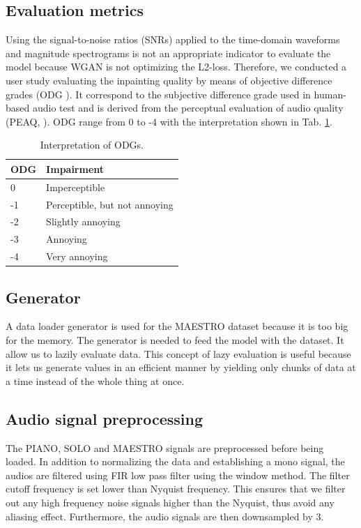 \documentclass{article} %
\begin{document}
\subsection{Evaluation metrics}
Using the signal-to-noise ratios (SNRs) applied to the time-domain waveforms and magnitude spectrograms is not an appropriate indicator to evaluate the model because WGAN is not optimizing the L2-loss. Therefore, we conducted a user study evaluating the inpainting quality by means of objective difference grades (ODG \cite{recommendatioin2001}). It correspond to the subjective difference grade used in human-based audio test and is derived from the perceptual evaluation of audio quality (PEAQ, \cite{recommendatioin2001}). ODG range from 0 to -4 with the interpretation shown in Tab. \ref{tab:odg}.
\begin{table}[ht]
    \centering
    \begin{tabular}{l|l}
        \hline
        ODG & Impairment \\
        \hline
        0   & Imperceptible \\
        -1  & Perceptible, but not annoying \\ 
        -2  & Slightly annoying \\
        -3  & Annoying \\
        -4  & Very annoying \\
        \hline
    \end{tabular}
    \caption{Interpretation of ODGs.}
    \label{tab:odg}
\end{table}

\subsection{Generator}
A data loader generator is used for the MAESTRO dataset because it is too big for the memory. The generator is needed to feed the model with the dataset. It allow us to lazily evaluate data. This concept of lazy evaluation is useful because it lets us generate values in an efficient manner by yielding only chunks of data at a time instead of the whole thing at once.

\subsection{Audio signal preprocessing}
The PIANO, SOLO and MAESTRO signals are preprocessed before being loaded. In addition to normalizing the data and establishing a mono signal, the audios are filtered using FIR low pass filter using the window method. The filter cutoff frequency is set lower than Nyquist frequency. This ensures that we filter out any high frequency noise signals higher than the Nyquist, thus avoid any aliasing effect. Furthermore, the audio signals are then downsampled by 3.
\end{document}

